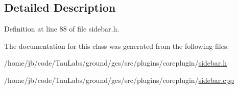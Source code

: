 \subsection{\-Detailed \-Description}


\-Definition at line 88 of file sidebar.\-h.



\-The documentation for this class was generated from the following files\-:\begin{DoxyCompactItemize}
\item 
/home/jb/code/\-Tau\-Labs/ground/gcs/src/plugins/coreplugin/\hyperlink{sidebar_8h}{sidebar.\-h}\item 
/home/jb/code/\-Tau\-Labs/ground/gcs/src/plugins/coreplugin/\hyperlink{sidebar_8cpp}{sidebar.\-cpp}\end{DoxyCompactItemize}
